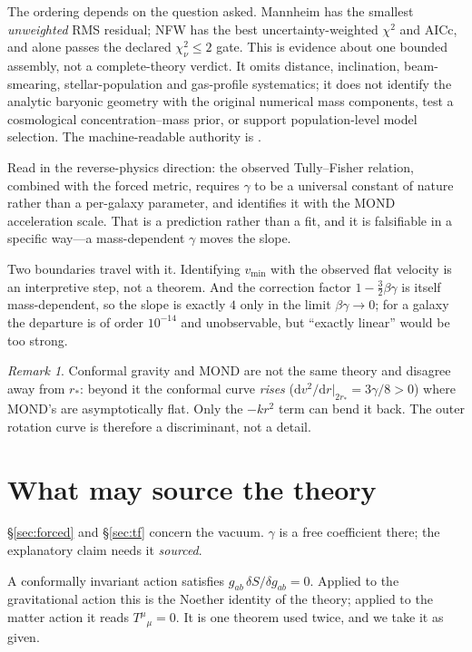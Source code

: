 \documentclass[11pt]{article}
\theoremstyle{definition}
\theoremstyle{remark}
\newtheorem{remark}[theorem]{Remark}
\newcommand{\dd}{\mathrm d}
\begin{document}
The ordering depends on the question asked.  Mannheim has the smallest
\emph{unweighted} RMS residual; NFW has the best uncertainty-weighted
\(\chi^2\) and AICc, and alone passes the declared
\(\chi^2_\nu\leq2\) gate.  This is evidence about one bounded assembly, not a
complete-theory verdict.  It omits distance, inclination, beam-smearing,
stellar-population and gas-profile systematics; it does not identify the
analytic baryonic geometry with the original numerical mass components, test
a cosmological concentration--mass prior, or support population-level model
selection.  The machine-readable authority is
.

Read in the reverse-physics direction: the observed Tully--Fisher relation,
combined with the forced metric, requires \(\gamma\) to be a universal
constant of nature rather than a per-galaxy parameter, and identifies it with
the MOND acceleration scale.  That is a prediction rather than a fit, and it
is falsifiable in a specific way---a mass-dependent \(\gamma\) moves the
slope.

Two boundaries travel with it.  Identifying \(v_{\min}\) with the observed
flat velocity is an interpretive step, not a theorem.  And the correction
factor \(1-\tfrac{3}{2}\beta\gamma\) is itself mass-dependent, so the slope
is exactly \(4\) only in the limit \(\beta\gamma\to0\); for a galaxy the
departure is of order \(10^{-14}\) and unobservable, but ``exactly linear''
would be too strong.

\begin{remark}
Conformal gravity and MOND are not the same theory and disagree away from
\(r_{*}\): beyond it the conformal curve \emph{rises}
(\(\dd v^{2}/\dd r|_{2r_{*}}=3\gamma/8>0\)) where MOND's are asymptotically
flat.  Only the \(-kr^{2}\) term can bend it back.  The outer rotation curve
is therefore a discriminant, not a detail.
\end{remark}

\section{What may source the theory}
\label{sec:matter}

\S\ref{sec:forced} and \S\ref{sec:tf} concern the vacuum.  \(\gamma\) is a
free coefficient there; the explanatory claim needs it \emph{sourced}.

A conformally invariant action satisfies
\(g_{ab}\,\delta S/\delta g_{ab}=0\).  Applied to the gravitational action
this is the Noether identity of the theory; applied to the matter action it
reads \(T^{\mu}{}_{\mu}=0\).  It is one theorem used twice, and we take it as
given.
\end{document}
